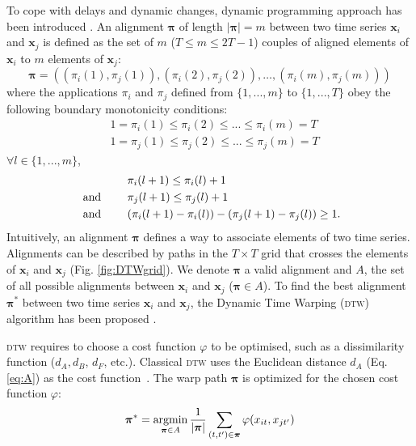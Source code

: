To cope with delays and dynamic changes, dynamic programming approach has been introduced \cite{Berndt1994a}. An alignment $\boldsymbol{\pi}$ of length $|\boldsymbol{\pi}|=m$ between two time series $\textbf{x}_i$ and $\textbf{x}_j$ is defined as the set of $m$ ($T \leq m \leq 2T-1$) couples of aligned elements of $\textbf{x}_i$ to $m$ elements of $\textbf{x}_j$:
\begin{equation}
\boldsymbol{\pi} = 
\left(  
(\pi_i(1),\pi_j(1)), 
(\pi_i(2),\pi_j(2)), 
\ldots,
(\pi_i(m),\pi_j(m))
\right) 
\end{equation}
\noindent where the applications $\pi_i$ and $\pi_j$ defined from $\{1, ..., m\}$ to $\{1, ..., T\}$ obey the following boundary monotonicity conditions: 
\begin{align}
& 1 = \pi_i(1) \leq \pi_i(2) \leq ... \leq \pi_i(m) = T \\
& 1 = \pi_j(1) \leq \pi_j(2) \leq ... \leq \pi_j(m) = T 
\end{align}
$\forall l \in \{1, ..., m\}$, 
\begin{align}
& \pi_i(l+1) \leq \pi_i(l)+1 \\
\text{  and  \qquad} & \pi_j(l+1) \leq \pi_j(l)+1 \\
\text{  and  \qquad} & ( \pi_i(l+1)-\pi_i(l) ) - ( \pi_j(l+1)-\pi_j(l)) \geq 1 . 
\end{align}
Intuitively, an alignment $\boldsymbol{\pi}$ defines a way to associate elements of two time series. Alignments can be described by paths in the $T \times T$ grid that crosses the elements of $\textbf{x}_i$ and $\textbf{x}_j$ (Fig. \ref{fig:DTWgrid}). We denote $\boldsymbol{\pi}$ a valid alignment and $A$, the set of all possible alignments between $\textbf{x}_i$ and $\textbf{x}_j$ ($\boldsymbol{\pi} \in A$). To find the best alignment $\boldsymbol{\pi}^*$ between two time series $\textbf{x}_i$ and $\textbf{x}_j$, the Dynamic Time Warping (\textsc{dtw}) algorithm has been proposed \cite{Keogh2004,Salvador}.

\textsc{dtw} requires to choose a cost function $\varphi$ to be optimised, such as a dissimilarity function ($d_A, d_B$, $d_F$, etc.). Classical \textsc{dtw} uses the Euclidean distance $d_A$ (Eq. \ref{eq:A}) as the cost function~\cite{Berndt1994a}. The warp path $\boldsymbol{\pi}$ is optimized for the chosen cost function $\varphi$:
\begin{equation}
\boldsymbol{\pi}^* = \argmin_{\boldsymbol{\pi} \in A} \frac{1}{|\boldsymbol{\pi}|}
\sum_{(t,t') \in \boldsymbol{\pi}} \varphi(x_{it}, x_{jt'})
\label{eq:DTW}
\end{equation}

